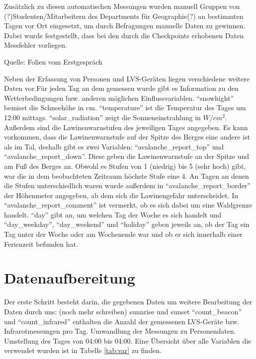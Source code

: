 \documentclass[11pt,a4paper]{report}
\begin{document}
Zusätzlich zu diesen automatischen Messungen wurden manuell Gruppen von (?)Studenten/Mitarbeitern des Departments für Geographie(?) an bestimmten Tagen vor Ort eingesetzt, um durch Befragungen manuelle Daten zu gewinnen. Dabei wurde festgestellt, dass bei den durch die Checkpoints erhobenen Daten Messfehler vorliegen.

Quelle:
Folien vom Erstgespräch

Neben der Erfassung von Personen und LVS-Geräten liegen verschiedene weitere Daten vor.Für jeden Tag an dem gemessen wurde gibt es Information zu den Wetterbedingungen bzw. anderen möglichen Einflussvariablen. "`snowhight"' bemisst die Schneehöhe in cm. "`temperature"' ist die Temperatur des Tages um 12:00 mittags. "`solar\_radiation"' zeigt die Sonneneinstrahlung in $W/cm^2$. Außerdem sind die Lawinenwarnstufen des jeweiligen Tages angegeben. Es kann vorkommen, dass die Lawinenwarnstufe auf der Spitze des Berges eine andere ist als im Tal, deshalb gibt es zwei Variablen: "`avalanche\_report\_top"' und "`avalanche\_report\_down"'. Diese geben die Lawinenwarnstufe an der Spitze und am Fuß des Berges an. Obwohl es Stufen von 1 (niedrig) bis 5 (sehr hoch) gibt, war die in dem beobachteten Zeitraum höchste Stufe eine 4. An Tagen an denen die Stufen unterschiedlich waren wurde außerdem in "`avalanche\_report\_border"' der Höhenmeter angegeben, ab dem sich die Lawinengefahr unterscheidet. In "`avalanche\_report\_comment"' ist vermerkt, ob es sich dabei um eine Waldgrenze handelt. "`day"' gibt an, um welchen Tag der Woche es sich handelt und "`day\_weekday"', "`day\_weekend"' und "`holiday"' geben jeweils an, ob der Tag ein Tag unter der Woche oder am Wochenende war und ob er sich innerhalb einer Ferienzeit befunden hat.

\section{Datenaufbereitung}

Der erste Schritt besteht darin, die gegebenen Daten um weitere 
Bearbeitung der Daten durch uns:
(noch mehr schreiben)
sunnrise und sunset
"`count\_beacon"' und "`count\_infrared"' enthalten die Anzahl der gemessenen LVS-Geräte bzw. Infrarotmessungen pro Tag.
Umwandlung der Messungen zu Personendaten. Umstellung des Tages von 04:00 bis 04:00.
 Eine Übersicht über alle Variablen die verwendet wurden ist in Tabelle \ref{tab:var} zu finden.
\end{document}
